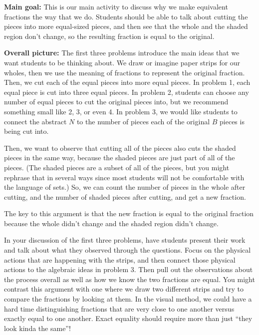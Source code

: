 \documentclass[nooutcomes,noauthor,handout]{ximera}
\begin{document}
\begin{instructorNotes}

{\bf Main goal:} This is our main activity to discuss why we make equivalent fractions the way that we do. Students should be able to talk about cutting the pieces into more equal-sized pieces, and then see that the whole and the shaded region don't change, so the resulting fraction is equal to the original.

{\bf Overall picture:}
The first three problems introduce the main ideas that we want students to be thinking about. We draw or imagine paper strips for our wholes, then we use the meaning of fractions to represent the original fraction. Then, we cut each of the equal pieces into more equal pieces. In problem 1, each equal piece is cut into three equal pieces. In problem 2, students can choose any number of equal pieces to cut the original pieces into, but we recommend something small like 2, 3, or even 4. In problem 3, we would like students to connect the abstract $N$ to the number of pieces each of the original $B$ pieces is being cut into. 

Then, we want to observe that cutting all of the pieces also cuts the shaded pieces in the same way, because the shaded pieces are just part of all of the pieces. (The shaded pieces are a subset of all of the pieces, but you might rephrase that in several ways since most students will not be comfortable with the language of sets.) So, we can count the number of pieces in the whole after cutting, and the number of shaded pieces after cutting, and get a new fraction.

The key to this argument is that the new fraction is equal to the original fraction because the whole didn't change and the shaded region didn't change. 

In your discussion of the first three problems, have students present their work and talk about what they observed through the questions. Focus on the physical actions that are happening with the strips, and then connect those physical actions to the algebraic ideas in problem 3. Then pull out the observations about the process overall as well as how we know the two fractions are equal. You might contrast this argument with one where we draw two different strips and try to compare the fractions by looking at them. In the visual method, we could have a hard time distinguishing fractions that are very close to one another versus exactly equal to one another. Exact equality should require more than just ``they look kinda the same''!


\end{instructorNotes}
\end{document}
